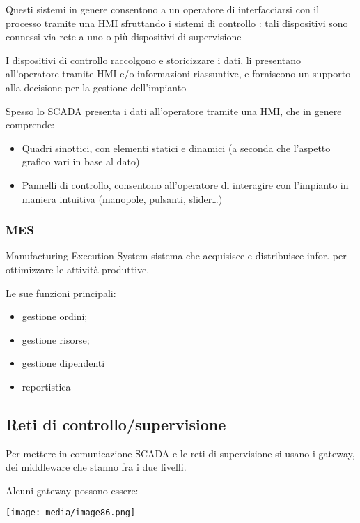 Questi sistemi in genere consentono a un operatore di interfacciarsi con
il processo tramite una HMI sfruttando i sistemi di controllo : tali
dispositivi sono connessi via rete a uno o più dispositivi di
supervisione

I dispositivi di controllo raccolgono e storicizzare i dati, li
presentano all'operatore tramite HMI e/o informazioni riassuntive, e
forniscono un supporto alla decisione per la gestione dell'impianto

Spesso lo SCADA presenta i dati all'operatore tramite una HMI, che in
genere comprende:

\begin{itemize}
\item
  Quadri sinottici, con elementi statici e dinamici (a seconda che
  l'aspetto grafico vari in base al dato)
\item
  Pannelli di controllo, consentono all'operatore di interagire con
  l'impianto in maniera intuitiva (manopole, pulsanti, slider\ldots)
\end{itemize}

\subsubsection{MES}\label{mes}

Manufacturing Execution System sistema che acquisisce e distribuisce
infor. per ottimizzare le attività produttive.

Le sue funzioni principali:

\begin{itemize}
\item
  gestione ordini;
\item
  gestione risorse;
\item
  gestione dipendenti
\item
  reportistica
\end{itemize}

\subsection{Reti di
controllo/supervisione}\label{reti-di-controllosupervisione}

Per mettere in comunicazione SCADA e le reti di supervisione si usano i
gateway, dei middleware che stanno fra i due livelli.

Alcuni gateway possono essere:

\texttt{[image: media/image86.png]}

